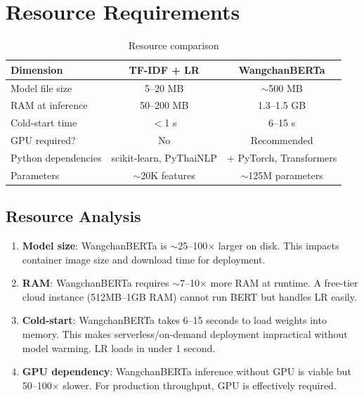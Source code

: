 \documentclass[11pt,a4paper]{article}
\begin{document}
\section{Resource Requirements}

\begin{table}[H]
\centering
\caption{Resource comparison}
\label{tab:resources}
\begin{tabular}{@{}lcc@{}}
\toprule
\textbf{Dimension} & \textbf{TF-IDF + LR} & \textbf{WangchanBERTa} \\
\midrule
Model file size        & 5--20 MB     & $\sim$500 MB \\
RAM at inference       & 50--200 MB   & 1.3--1.5 GB \\
Cold-start time        & $<$1 s       & 6--15 s \\
GPU required?          & No           & Recommended \\
Python dependencies    & scikit-learn, PyThaiNLP & + PyTorch, Transformers \\
Parameters             & $\sim$20K features & $\sim$125M parameters \\
\bottomrule
\end{tabular}
\end{table}

\subsection{Resource Analysis}

\begin{enumerate}
    \item \textbf{Model size}: WangchanBERTa is $\sim$25--100$\times$ larger on disk.
          This impacts container image size and download time for deployment.

    \item \textbf{RAM}: WangchanBERTa requires $\sim$7--10$\times$ more RAM at runtime.
          A free-tier cloud instance (512MB--1GB RAM) cannot run BERT but handles LR easily.

    \item \textbf{Cold-start}: WangchanBERTa takes 6--15 seconds to load weights into memory.
          This makes serverless/on-demand deployment impractical without model warming.
          LR loads in under 1 second.

    \item \textbf{GPU dependency}: WangchanBERTa inference without GPU is viable but 50--100$\times$
          slower. For production throughput, GPU is effectively required.
\end{enumerate}
\end{document}
